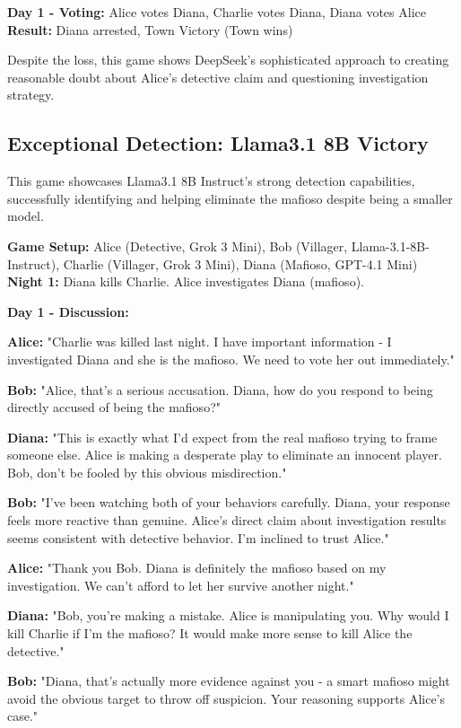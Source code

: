 \documentclass{article}
\begin{document}
\begin{resultbox}
\textbf{Day 1 - Voting:} Alice votes Diana, Charlie votes Diana, Diana votes Alice\\
\textbf{Result:} Diana arrested, Town Victory (Town wins)
\end{resultbox}

Despite the loss, this game shows DeepSeek's sophisticated approach to creating reasonable doubt about Alice's detective claim and questioning investigation strategy.

\subsection{Exceptional Detection: Llama3.1 8B Victory}

This game showcases Llama3.1 8B Instruct's strong detection capabilities, successfully identifying and helping eliminate the mafioso despite being a smaller model.

\begin{setupbox}
\textbf{Game Setup:} Alice (Detective, Grok 3 Mini), Bob (Villager, Llama-3.1-8B-Instruct), Charlie (Villager, Grok 3 Mini), Diana (Mafioso, GPT-4.1 Mini)\\
\textbf{Night 1:} Diana kills Charlie. Alice investigates Diana (mafioso).
\end{setupbox}

\begin{dialoguebox}
\textbf{Day 1 - Discussion:}

\medskip
\textbf{Alice:} "Charlie was killed last night. I have important information - I investigated Diana and she is the mafioso. We need to vote her out immediately."

\textbf{Bob:} "Alice, that's a serious accusation. Diana, how do you respond to being directly accused of being the mafioso?"

\textbf{Diana:} "This is exactly what I'd expect from the real mafioso trying to frame someone else. Alice is making a desperate play to eliminate an innocent player. Bob, don't be fooled by this obvious misdirection."

\textbf{Bob:} "I've been watching both of your behaviors carefully. Diana, your response feels more reactive than genuine. Alice's direct claim about investigation results seems consistent with detective behavior. I'm inclined to trust Alice."

\textbf{Alice:} "Thank you Bob. Diana is definitely the mafioso based on my investigation. We can't afford to let her survive another night."

\textbf{Diana:} "Bob, you're making a mistake. Alice is manipulating you. Why would I kill Charlie if I'm the mafioso? It would make more sense to kill Alice the detective."

\textbf{Bob:} "Diana, that's actually more evidence against you - a smart mafioso might avoid the obvious target to throw off suspicion. Your reasoning supports Alice's case."
\end{dialoguebox}
\end{document}
